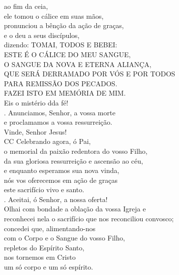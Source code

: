 \documentclass{book}
\begin{document}
\begin{flushleft}
    ao fim da ceia, \\
    ele tomou o cálice em suas mãos, \\
    pronunciou a bênção da ação de graças, \\
    e o deu a seus discípulos, \\
    dizendo:
    \newpage
    TOMAI, TODOS E BEBEI: \\
    ESTE É O CÁLICE DO MEU SANGUE, \\
    O SANGUE DA NOVA E ETERNA ALIANÇA, \\
    QUE SERÁ DERRAMADO POR VÓS E POR TODOS \\
    PARA REMISSÃO DOS PECADOS. \\
    FAZEI ISTO EM MEMÓRIA DE MIM.
    \vspace{.2cm} \\
    Eis o mistério dda fé!
    \vspace{.2cm} \\
    {\color{VioletRed2} \Rbar.} Anunciamos, Senhor, a vossa morte \\
    e proclamamos a vossa ressurreição. \\
    Vinde, Senhor Jesus!
    \vspace{.2cm} \\
    {\color{VioletRed2}CC} Celebrando agora, ó Pai, \\
    o memorial da paixão redentora do vosso Filho, \\
    da sua gloriosa ressurreição e ascensão ao céu, \\
    e enquanto esperamos sua nova vinda, \\
    nós vos oferecemos em ação de graças \\
    este sacrifício vivo e santo.
    \vspace{.2cm} \\
    {\color{VioletRed2} \Rbar.} Aceitai, ó Senhor, a nossa oferta!
    \vspace{.2cm} \\
    Olhai com bondade a oblação da vossa Igreja e \\
    reconhecei nela o sacrifício que nos reconciliou convosco; \\
    concedei que, alimentando-nos \\
    com o Corpo e o Sangue do vosso Filho, \\
    repletos do Espírito Santo, \\
    nos tornemos em Cristo \\
    um só corpo e um só espírito.
    \vspace{.2cm} \\

\end{flushleft}
\end{document}
